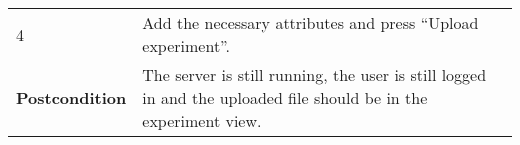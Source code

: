 \begin{longtable}[c]{@{}ll@{}}
\begin{minipage}[t]{0.31\columnwidth}
4
\strut\end{minipage} &
\begin{minipage}[t]{0.63\columnwidth}\raggedright\strut
Add the necessary attributes and press ``Upload experiment''.
\strut\end{minipage}\tabularnewline
\begin{minipage}[t]{0.31\columnwidth}\raggedright\strut
\textbf{Postcondition}
\strut\end{minipage} &
\begin{minipage}[t]{0.63\columnwidth}\raggedright\strut
The server is still running, the user is still logged in and the
uploaded file should be in the experiment view.
\strut\end{minipage}\tabularnewline
\bottomrule
\end{longtable}

